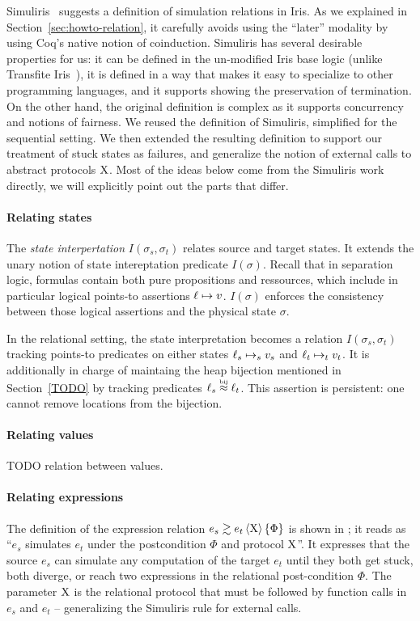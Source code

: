 Simuliris~\citep*{TODO-simuliris} suggests a definition of simulation relations in Iris. As we explained in Section~\ref{sec:howto-relation}, it carefully avoids using the ``later'' modality by using Coq's native notion of coinduction. Simuliris has several desirable properties for us: it can be defined in the un-modified Iris base logic (unlike Transfite Iris~\citep*{transfinite-iris}), it is defined in a way that makes it easy to specialize to other programming languages, and it supports showing the preservation of termination. On the other hand, the original definition is complex as it supports concurrency and notions of fairness. We reused the definition of Simuliris, simplified for the sequential setting. We then extended the resulting definition to support our treatment of stuck states as failures, and generalize the notion of external calls to abstract protocols $\mathrm{X}$. Most of the ideas below come from the Simuliris work directly, we will explicitly point out the parts that differ.

\paragraph{Relating states} The \emph{state interpertation} $I(\sigma_s, \sigma_t)$ relates source and target states. It extends the unary notion of state intereptation predicate $I(\sigma)$. Recall that in separation logic, formulas contain both pure propositions and ressources, which include in particular logical points-to assertions $\ell \mapsto v$. $I(\sigma)$ enforces the consistency between those logical assertions and the physical state $\sigma$.

In the relational setting, the state interpretation becomes a relation $I(\sigma_s, \sigma_t)$ tracking points-to predicates on either states $\ell_s \mapsto_s v_s$ and $\ell_t \mapsto_t v_t$. It is additionally in charge of maintaing the heap bijection mentioned in Section~\ref{TODO} by tracking predicates $\ell_s \stackrel{\scriptscriptstyle\textrm{bij}}{\approx} \ell_t$. This assertion is persistent: one cannot remove locations from the bijection.

\paragraph{Relating values} TODO relation between values.

\paragraph{Relating expressions} The definition of the expression relation $\iSim[\Chi]{\Phi}{e_s}{e_t}$ is shown in ; it reads as ``$e_s$ simulates $e_t$ under the postcondition $\Phi$ and protocol $\mathrm{X}$''. It expresses that the source $e_s$ can simulate any computation of the target $e_t$ until they both get stuck, both diverge, or reach two expressions in the relational post-condition $\Phi$. The parameter $\mathrm{X}$ is the relational protocol that must be followed by function calls in $e_s$ and $e_t$ -- generalizing the Simuliris rule for external calls.

